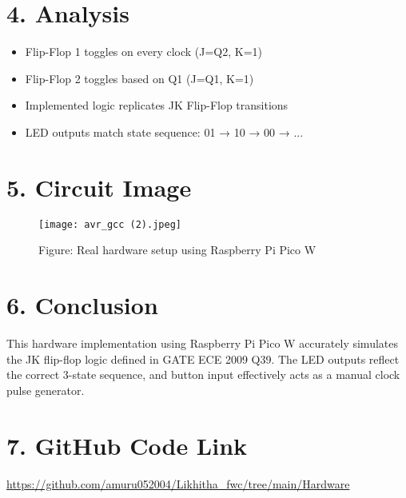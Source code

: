 \documentclass[12pt]{article}
\begin{document}
\begin{multicols}{2}
\end{multicols}

\newpage


\section*{4. Analysis}
\begin{itemize}
    \item Flip-Flop 1 toggles on every clock (J=Q2, K=1)
    \item Flip-Flop 2 toggles based on Q1 (J=Q1, K=1)
    \item Implemented logic replicates JK Flip-Flop transitions
    \item LED outputs match state sequence: 01 → 10 → 00 → ...
\end{itemize}

\section*{5. Circuit Image}
\begin{figure}[H]
    \centering
    \texttt{[image: avr\_gcc (2).jpeg]} %
    \caption*{Figure: Real hardware setup using Raspberry Pi Pico W}
\end{figure}

\section*{6. Conclusion}
This hardware implementation using Raspberry Pi Pico W accurately simulates the JK flip-flop logic defined in GATE ECE 2009 Q39. The LED outputs reflect the correct 3-state sequence, and button input effectively acts as a manual clock pulse generator.
\section*{7. GitHub Code Link}
\url{https://github.com/amuru052004/Likhitha_fwc/tree/main/Hardware}
\end{document}
